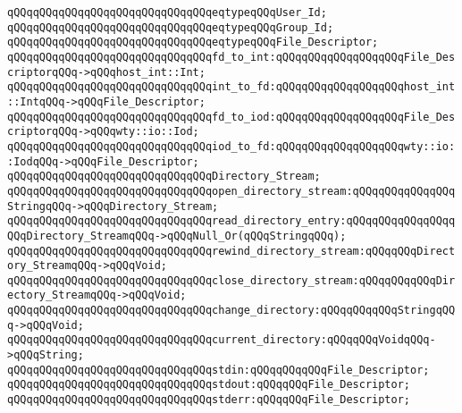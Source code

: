 \verb|qQQqqQQqqQQqqQQqqQQqqQQqqQQqqQQqeqtypeqQQqUser_Id;|\newline
\verb|qQQqqQQqqQQqqQQqqQQqqQQqqQQqqQQqeqtypeqQQqGroup_Id;|\newline
\verb|qQQqqQQqqQQqqQQqqQQqqQQqqQQqqQQqeqtypeqQQqFile_Descriptor;|\newline
\newline
\verb|qQQqqQQqqQQqqQQqqQQqqQQqqQQqqQQqfd_to_int:qQQqqQQqqQQqqQQqqQQqFile_DescriptorqQQq->qQQqhost_int::Int;|\newline
\verb|qQQqqQQqqQQqqQQqqQQqqQQqqQQqqQQqint_to_fd:qQQqqQQqqQQqqQQqqQQqhost_int::IntqQQq->qQQqFile_Descriptor;|\newline
\newline
\verb|qQQqqQQqqQQqqQQqqQQqqQQqqQQqqQQqfd_to_iod:qQQqqQQqqQQqqQQqqQQqFile_DescriptorqQQq->qQQqwty::io::Iod;|\newline
\verb|qQQqqQQqqQQqqQQqqQQqqQQqqQQqqQQqiod_to_fd:qQQqqQQqqQQqqQQqqQQqwty::io::IodqQQq->qQQqFile_Descriptor;|\newline
\newline
\verb|qQQqqQQqqQQqqQQqqQQqqQQqqQQqqQQqDirectory_Stream;|\newline
\newline
\verb|qQQqqQQqqQQqqQQqqQQqqQQqqQQqqQQqopen_directory_stream:qQQqqQQqqQQqqQQqStringqQQq->qQQqDirectory_Stream;|\newline
\verb|qQQqqQQqqQQqqQQqqQQqqQQqqQQqqQQqread_directory_entry:qQQqqQQqqQQqqQQqqQQqDirectory_StreamqQQq->qQQqNull_Or(qQQqStringqQQq);|\newline
\verb|qQQqqQQqqQQqqQQqqQQqqQQqqQQqqQQqrewind_directory_stream:qQQqqQQqDirectory_StreamqQQq->qQQqVoid;|\newline
\verb|qQQqqQQqqQQqqQQqqQQqqQQqqQQqqQQqclose_directory_stream:qQQqqQQqqQQqDirectory_StreamqQQq->qQQqVoid;|\newline
\newline
\verb|qQQqqQQqqQQqqQQqqQQqqQQqqQQqqQQqchange_directory:qQQqqQQqqQQqStringqQQq->qQQqVoid;|\newline
\verb|qQQqqQQqqQQqqQQqqQQqqQQqqQQqqQQqcurrent_directory:qQQqqQQqVoidqQQq->qQQqString;|\newline
\newline
\verb|qQQqqQQqqQQqqQQqqQQqqQQqqQQqqQQqstdin:qQQqqQQqqQQqFile_Descriptor;|\newline
\verb|qQQqqQQqqQQqqQQqqQQqqQQqqQQqqQQqstdout:qQQqqQQqFile_Descriptor;|\newline
\verb|qQQqqQQqqQQqqQQqqQQqqQQqqQQqqQQqstderr:qQQqqQQqFile_Descriptor;|\newline

